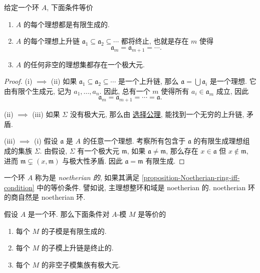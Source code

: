 \begin{proposition}
  \label{proposition-Noetherian-ring-iff-condition}
  给定一个环 \( A \), 下面条件等价
  \begin{enumerate}
    \item \( A \) 的每个理想都是有限生成的.
    \item \( A \) 的每个理想上升链 \( \mathfrak{a}_1 \subseteq \mathfrak{a}_2 \subseteq
      \cdots \) 都将终止, 也就是存在 \( m \) 使得
      \[
        \mathfrak{a}_m = \mathfrak{a}_{m + 1} = \cdots.
      \]
    \item \( A \) 的任何非空的理想集都存在一个极大元.
  \end{enumerate}
\end{proposition}
\begin{proof}
  (i) \( \implies \) (ii)
  如果 \( \mathfrak{a}_1 \subseteq \mathfrak{a}_2 \subseteq \cdots \)
  是一个上升链, 那么 \( \mathfrak{a} = \bigcup \mathfrak{a}_i \) 是一个理想.
  它由有限个生成元, 记为 \( a_1, \ldots, a_n \). 因此, 总有一个 \( m \) 使得所有
  \( a_i \in \mathfrak{a}_m \) 成立, 因此
  \[
    \mathfrak{a}_m = \mathfrak{a}_{m + 1} = \cdots = \mathfrak{a}.
  \]

  (ii) \( \implies \) (iii) 如果 \( \Sigma \) 没有极大元, 那么由
  \href{https://en.wikipedia.org/wiki/Axiom_of_choice}{选择公理},
  能找到一个无穷的上升链, 矛盾.

  (iii) \( \implies \) (i) 假设 \( \mathfrak{a} \) 是 \( A \) 的任意一个理想.
  考察所有包含于 \( \mathfrak{a} \) 的有限生成理想组成的集族 \( \Sigma \).
  由假设, \( \Sigma \) 有一个极大元 \( \mathfrak{m} \), 如果 \( \mathfrak{a}
  \neq \mathfrak{m} \), 那么存在 \( x \in \mathfrak{a} \) 但 \( x \notin
  \mathfrak{m} \), 进而 \( \mathfrak{m} \subsetneq \left( x,
  \mathfrak{m} \right) \) 与极大性矛盾. 因此 \( \mathfrak{a} = \mathfrak{m} \)
  有限生成.
\end{proof}

一个环 \( A \) 称为是 \emph{noetherian 的}, 如果其满足
\cref{proposition-Noetherian-ring-iff-condition} 中的等价条件. 譬如说,
主理想整环和域是 noetherian 的. noetherian 环的商自然是 noetherian 环.

\begin{proposition}
  \label{proposition-Noetherian-module-iff-condition}
  假设 \( A \) 是一个环. 那么下面条件对 \( A \)-模 \( M \) 是等价的
  \begin{enumerate}
    \item 每个 \( M \) 的子模是有限生成的.
    \item 每个 \( M \) 的子模上升链是终止的.
    \item 每个 \( M \) 的非空子模集族有极大元.
  \end{enumerate}
\end{proposition}

